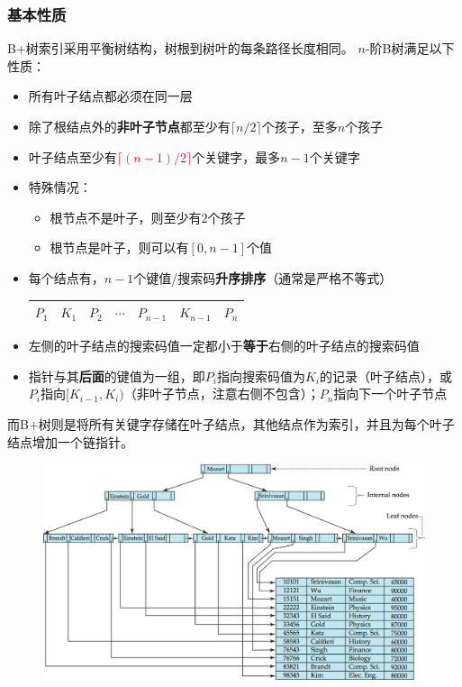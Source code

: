 \subsubsection{基本性质}
B+树索引采用平衡树结构，树根到树叶的每条路径长度相同。
$n$-阶B树满足以下性质：
\begin{itemize}
	\item 所有叶子结点都必须在同一层
	\item 除了根结点外的\textbf{非叶子节点}都至少有$\lceil n/2\rceil$个孩子，至多$n$个孩子
	\item 叶子结点至少有\textcolor{red}{$\lceil (n-1)/2\rceil$}个关键字，最多$n-1$个关键字
	\item 特殊情况：
	\begin{itemize}
		\item 根节点不是叶子，则至少有$2$个孩子
		\item 根节点是叶子，则可以有$[0,n-1]$个值
	\end{itemize}
	\item 每个结点有，$n-1$个键值/搜索码\textbf{升序排序}（通常是严格不等式）
	\begin{center}
	\begin{tabular}{|c|c|c|c|c|c|c|}\hline
	$P_1$ & $K_1$ & $P_2$ & $\cdots$ & $P_{n-1}$ & $K_{n-1}$ & $P_n$\\\hline
	\end{tabular}
	\end{center}
	\item 左侧的叶子结点的搜索码值一定都小于\textbf{等于}右侧的叶子结点的搜索码值
	\item 指针与其\textbf{后面}的键值为一组，即$P_i$指向搜索码值为$K_i$的记录（叶子结点），或$P_i$指向$[K_{i-1},K_i)$（非叶子节点，注意右侧不包含）；$P_n$指向下一个叶子节点
\end{itemize}

而B+树则是将所有关键字存储在叶子结点，其他结点作为索引，并且为每个叶子结点增加一个链指针。
\begin{figure}[H]
\centering
\includegraphics[width=0.6\linewidth]{fig/bp-tree.png}
\end{figure}

